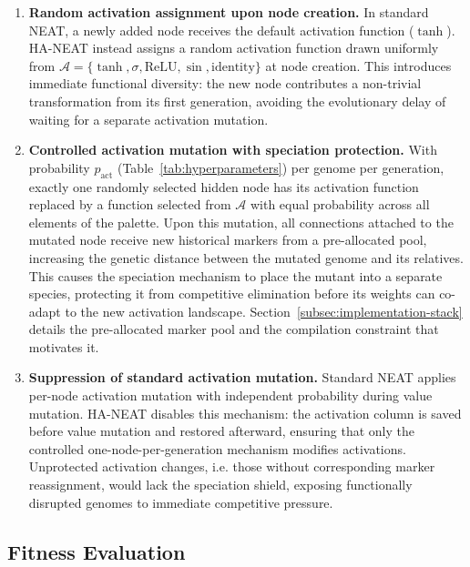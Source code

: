 \documentclass[12pt]{article}
\begin{document}
\begin{enumerate}
    \item \textbf{Random activation assignment upon node creation.} In standard NEAT, a newly added node receives the default activation function ($\tanh$). HA-NEAT instead assigns a random activation function drawn uniformly from $\mathcal{A} = \{\tanh, \sigma, \text{ReLU}, \sin, \text{identity}\}$ at node creation. This introduces immediate functional diversity: the new node contributes a non-trivial transformation from its first generation, avoiding the evolutionary delay of waiting for a separate activation mutation.
    
    \item \textbf{Controlled activation mutation with speciation protection.} With probability $p_{\text{act}}$ (Table~\ref{tab:hyperparameters}) per genome per generation, exactly one randomly selected hidden node has its activation function replaced by a function selected from
    $\mathcal{A}$ with equal probability across all elements of the palette. Upon this mutation, all connections attached to the mutated node receive new historical markers from a pre-allocated pool, increasing the genetic distance between the mutated genome and its relatives. This causes the speciation mechanism to place the mutant into a separate species, protecting it from competitive elimination before its weights can co-adapt to the new activation landscape. Section~\ref{subsec:implementation-stack} details the pre-allocated marker pool and the compilation constraint that motivates it.
    
    \item \textbf{Suppression of standard activation mutation.} Standard NEAT applies per-node activation mutation with independent probability during value mutation. HA-NEAT disables this mechanism: the activation column is saved before value mutation and restored afterward, ensuring that only the controlled one-node-per-generation mechanism modifies activations. Unprotected activation changes, i.e. those without corresponding marker reassignment, would lack the speciation shield, exposing functionally disrupted genomes to immediate competitive pressure.
\end{enumerate}


\subsection{Fitness Evaluation}
\label{subsec:fitness-evaluation}
\end{document}
